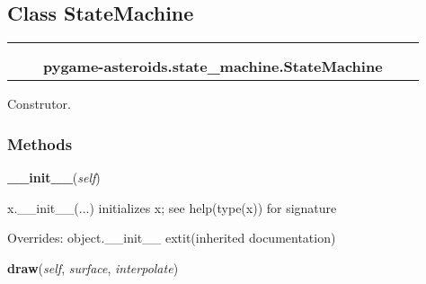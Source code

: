 \subsection{Class StateMachine}

    \label{pygame-asteroids:state_machine:StateMachine}
\begin{tabular}{cccccc}
\multicolumn{2}{r}{\settowidth{\BCL}{object}\multirow{2}{\BCL}{object}}
&&
  \\\cline{3-3}
  &&\multicolumn{1}{c|}{}
&&
  \\
&&\multicolumn{2}{l}{\textbf{pygame-asteroids.state\_machine.StateMachine}}
\end{tabular}

Construtor.



  \subsubsection{Methods}

    \vspace{0.5ex}

\hspace{.8\funcindent}\begin{boxedminipage}{\funcwidth}

    \raggedright \textbf{\_\_init\_\_}(\textit{self})

\setlength{\parskip}{2ex}
    x.\_\_init\_\_(...) initializes x; see help(type(x)) for signature

\setlength{\parskip}{1ex}
      Overrides: object.\_\_init\_\_ 	extit{(inherited documentation)}

    \end{boxedminipage}

    \label{pygame-asteroids:state_machine:StateMachine:draw}

    \vspace{0.5ex}

\hspace{.8\funcindent}\begin{boxedminipage}{\funcwidth}

    \raggedright \textbf{draw}(\textit{self}, \textit{surface}, \textit{interpolate})

\setlength{\parskip}{2ex}
\setlength{\parskip}{1ex}
    \end{boxedminipage}


